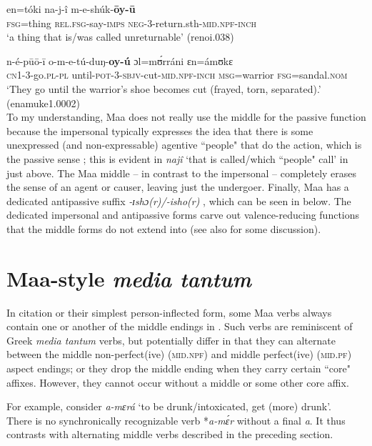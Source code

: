 \documentclass[output=paper,colorlinks,citecolor=brown
]{langscibook}
\begin{document}
\ea\label{ex:Payne:unreturnable}
\gll en=tóki		na-j-î				m-e-shúk-\textbf{ōy-ū}		\\
\textsc{fsg}=thing	\textsc{rel.fsg}-say-\textsc{imps}	\textsc{neg}-3-return.sth-\textsc{mid.npf}-\textsc{inch}	\\		
\glt `a thing that is/was called unreturnable' (renoi.038)
\z 

\ea\label{ex:Payne:mid-inch}
\gll n-é-pūō-ī		o-m-e-tú-duŋ-\textbf{oy-ú} ɔl=mʊ́rráni		ɛn=ámʊkɛ \\	
\textsc{cn1}-3-go.\textsc{pl-pl}	until-\textsc{pot}-3-\textsc{sbjv}-cut-\textsc{mid.npf-inch} \textsc{msg}=warrior	\textsc{fsg}=sandal.\textsc{nom}\\
\glt `They go until the warrior's shoe becomes cut (frayed, torn, separated).' (enamuke1.0002)\\
\z 
To my understanding, Maa does not really use the middle for the passive function because the impersonal typically expresses the idea that there is some unexpressed (and non-expressable) agentive ``people" that do the action, which is the passive sense \citep{Payne2011}; this is evident in \textit{najî} `that is called/which ``people" call' in  just above. The Maa middle -- in contrast to the impersonal -- completely erases the sense of an agent or causer, leaving just the undergoer. Finally, Maa has a dedicated antipassive suffix \textit{-ɪshɔ(r)/-isho(r)} \citep{Payne2021-apas}, which can be seen in  below. The dedicated impersonal and antipassive forms carve out valence-reducing functions that the middle forms do not extend into (see also \citet{Inglese2022b} for some discussion).

\section{Maa-style \textit{media tantum}}\label{sec:Payne:MediaTantum}

In citation or their simplest person-inflected form, some Maa verbs always contain one or another of the middle endings in . Such verbs are reminiscent of Greek \textit{media tantum} verbs, but potentially differ in that they can alternate between the middle non-perfect(ive) (\textsc{mid.npf}) and middle perfect(ive) (\textsc{mid.pf}) aspect endings; or they drop the middle ending when they carry certain ``core" affixes. However, they cannot occur without a middle or some other core affix.

For example, consider \textit{a-mɛrá} `to be drunk/intoxicated, get (more) drunk'. \\
There is no synchronically recognizable verb *\textit{a-mɛ́r} without a final \textit{a}. It thus contrasts with alternating middle verbs described in the preceding section. 
\end{document}
